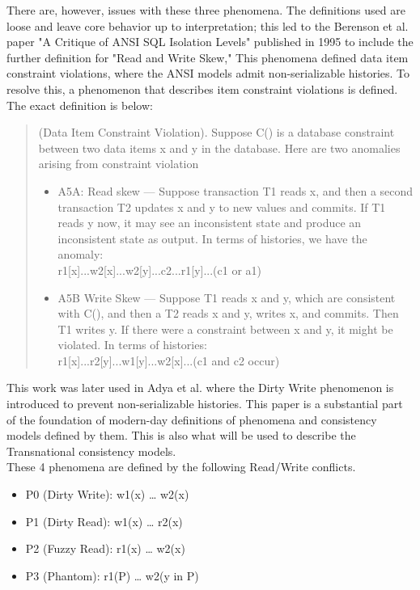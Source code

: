 \documentclass[a4paper,10pt,titlepage]{report}
\begin{document}
There are, however, issues with these three phenomena. The definitions used are loose and leave core behavior up to interpretation; this led to the Berenson et al. \cite{Berensonetal} paper "A Critique of ANSI SQL Isolation Levels" published in 1995 to include the further definition for "Read and Write Skew," This phenomena defined data item constraint violations, where the ANSI models admit non-serializable histories. To resolve this, a phenomenon that describes item constraint violations is defined. The exact definition is below: \\
\begin{quote}
    (Data Item Constraint Violation). Suppose C() is a database constraint between two data items x and y in the database. Here are two anomalies arising from constraint violation
\begin{itemize}
\item A5A: Read skew — Suppose transaction T1 reads x, and then a second transaction T2 updates x and y to new values and commits. If T1 reads y now, it may see an inconsistent state and produce an inconsistent state as output.
In terms of histories, we have the anomaly:   \\
 r1[x]...w2[x]...w2[y]...c2...r1[y]...(c1 or a1)
 
\item A5B Write Skew — Suppose T1 reads x and y, which are
consistent with C(), and then a T2 reads x and y, writes x,
    and commits. Then T1 writes y. If there were a constraint
    between x and y, it might be violated. In terms of histories: \\
r1[x]...r2[y]...w1[y]...w2[x]...(c1 and c2 occur)
    
\end{itemize}
\end{quote}

This work was later used in Adya et al. \cite{Adya99weakconsistency} where the Dirty Write phenomenon is introduced to prevent non-serializable histories. This paper is a substantial part of the foundation of modern-day definitions of phenomena and consistency models defined by them. This is also what will be used to describe the Transnational consistency models.\\

These 4 phenomena are defined by the following Read/Write conflicts.
\begin{itemize}
    \item P0 (Dirty Write): w1(x) … w2(x)
    \item P1 (Dirty Read): w1(x) … r2(x)
    \item P2 (Fuzzy Read): r1(x) … w2(x)
    \item P3 (Phantom): r1(P) … w2(y in P)
\end{itemize}
\end{document}
